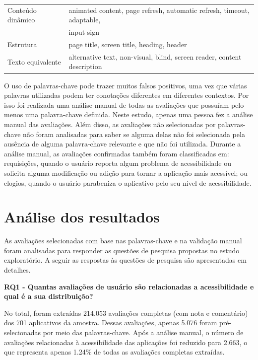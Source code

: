 \begin{table}[!htb]
\begin{tabular}{|l|l|}
\hline
Conteúdo dinâmico & animated content, page refresh, automatic  
refresh, timeout,  adaptable, \\&input sign                                                               \\

\hline
Estrutura                   & page title, screen title, heading, header                                                                                                         \\
\hline
Texto equivalente             & alternative text, non-visual, blind, screen reader, content description  \\
\hline
\end{tabular}
\end{table}

O uso de palavras-chave pode trazer muitos falsos positivos, uma vez que várias palavras utilizadas podem ter conotações diferentes em diferentes contextos. Por isso foi realizada uma análise manual de todas as avaliações que possuíam pelo menos uma palavra-chave definida. Neste estudo, apenas uma pessoa fez a análise manual das avaliações. Além disso, as avaliações não selecionadas por palavras-chave não foram analisadas para saber se alguma delas não foi selecionada pela ausência de alguma palavra-chave relevante e que não foi utilizada. Durante a análise manual, as avaliações confirmadas também foram classificadas em: 
requisições, quando o usuário reporta algum problema de acessibilidade ou solicita alguma modificação ou adição para tornar a aplicação mais acessível;
ou elogios, quando o usuário parabeniza o aplicativo pelo seu nível de acessibilidade.


\section{Análise dos resultados}

As avaliações selecionadas com base nas palavras-chave e na validação manual foram analisadas para responder as questões de pesquisa propostas no estudo exploratório. A seguir as respostas às questões de pesquisa são apresentadas em detalhes. 

 
\textbf{RQ1 - Quantas avaliações de usuário são relacionadas a acessibilidade e qual é a sua distribuição? }

No total, foram extraídas 214.053 avaliações completas (com nota e comentário) dos 701 aplicativos da amostra. 
Dessas avaliações, apenas 5.076 foram pré-selecionadas por meio das palavras-chave. 
Após a análise manual, o número de avaliações relacionadas à acessibilidade das aplicações foi reduzido para 2.663, o que representa apenas 1.24\% de todas as avaliações completas extraídas.

